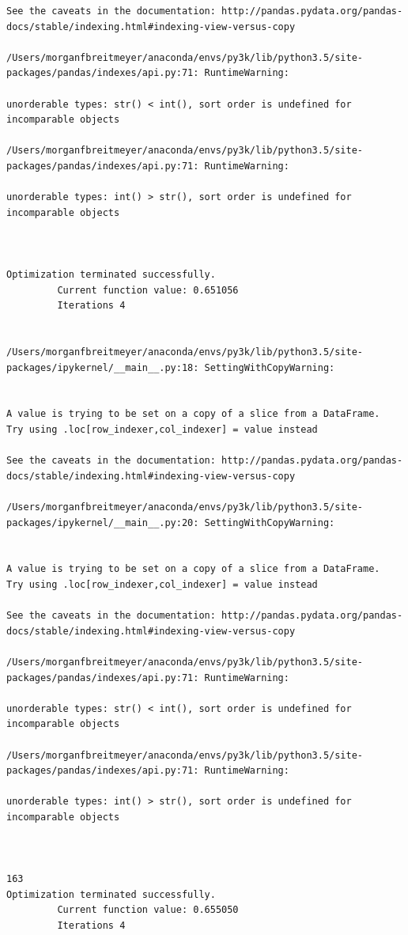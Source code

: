 \begin{lstlisting}
See the caveats in the documentation: http://pandas.pydata.org/pandas-docs/stable/indexing.html#indexing-view-versus-copy

/Users/morganfbreitmeyer/anaconda/envs/py3k/lib/python3.5/site-packages/pandas/indexes/api.py:71: RuntimeWarning:

unorderable types: str() < int(), sort order is undefined for incomparable objects

/Users/morganfbreitmeyer/anaconda/envs/py3k/lib/python3.5/site-packages/pandas/indexes/api.py:71: RuntimeWarning:

unorderable types: int() > str(), sort order is undefined for incomparable objects



Optimization terminated successfully.
         Current function value: 0.651056
         Iterations 4


/Users/morganfbreitmeyer/anaconda/envs/py3k/lib/python3.5/site-packages/ipykernel/__main__.py:18: SettingWithCopyWarning:


A value is trying to be set on a copy of a slice from a DataFrame.
Try using .loc[row_indexer,col_indexer] = value instead

See the caveats in the documentation: http://pandas.pydata.org/pandas-docs/stable/indexing.html#indexing-view-versus-copy

/Users/morganfbreitmeyer/anaconda/envs/py3k/lib/python3.5/site-packages/ipykernel/__main__.py:20: SettingWithCopyWarning:


A value is trying to be set on a copy of a slice from a DataFrame.
Try using .loc[row_indexer,col_indexer] = value instead

See the caveats in the documentation: http://pandas.pydata.org/pandas-docs/stable/indexing.html#indexing-view-versus-copy

/Users/morganfbreitmeyer/anaconda/envs/py3k/lib/python3.5/site-packages/pandas/indexes/api.py:71: RuntimeWarning:

unorderable types: str() < int(), sort order is undefined for incomparable objects

/Users/morganfbreitmeyer/anaconda/envs/py3k/lib/python3.5/site-packages/pandas/indexes/api.py:71: RuntimeWarning:

unorderable types: int() > str(), sort order is undefined for incomparable objects



163
Optimization terminated successfully.
         Current function value: 0.655050
         Iterations 4



\end{lstlisting}
